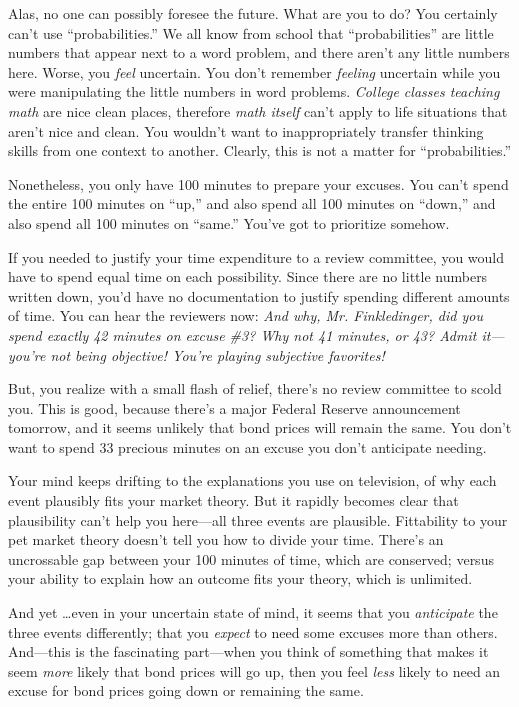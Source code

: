 {
 Alas, no one can possibly foresee the future. What are you to do?
You certainly can't use
``probabilities.'' We all know from
school that ``probabilities'' are
little numbers that appear next to a word problem, and there
aren't any little numbers here. Worse, you
\textit{feel} uncertain. You don't remember
\textit{feeling} uncertain while you were manipulating the little
numbers in word problems. \textit{College classes teaching math} are
nice clean places, therefore \textit{math itself} can't
apply to life situations that aren't nice and clean.
You wouldn't want to inappropriately transfer thinking
skills from one context to another. Clearly, this is not a matter for
``probabilities.''}

{
 Nonetheless, you only have 100 minutes to prepare your excuses.
You can't spend the entire 100 minutes on
``up,'' and also spend all 100
minutes on ``down,'' and also spend
all 100 minutes on ``same.''
You've got to prioritize somehow.}

{
 If you needed to justify your time expenditure to a review
committee, you would have to spend equal time on each possibility.
Since there are no little numbers written down, you'd
have no documentation to justify spending different amounts of time.
You can hear the reviewers now: \textit{And why, Mr. Finkledinger, did
you spend exactly 42 minutes on excuse \#3? Why not 41 minutes, or 43?
Admit it---you're not being objective!
You're playing subjective favorites!}}

{
 But, you realize with a small flash of relief,
there's no review committee to scold you. This is good,
because there's a major Federal Reserve announcement
tomorrow, and it seems unlikely that bond prices will remain the same.
You don't want to spend 33 precious minutes on an
excuse you don't anticipate needing.}

{
 Your mind keeps drifting to the explanations you use on
television, of why each event plausibly fits your market theory. But it
rapidly becomes clear that plausibility can't help you
here---all three events are plausible. Fittability to your pet market
theory doesn't tell you how to divide your time.
There's an uncrossable gap between your 100 minutes of
time, which are conserved; versus your ability to explain how an
outcome fits your theory, which is unlimited.}

{
 And yet \ldots even in your uncertain state of mind, it seems that
you \textit{anticipate} the three events differently; that you
\textit{expect} to need some excuses more than others. And---this is
the fascinating part---when you think of something that makes it seem
\textit{more} likely that bond prices will go up, then you feel
\textit{less} likely to need an excuse for bond prices going down or
remaining the same.}

